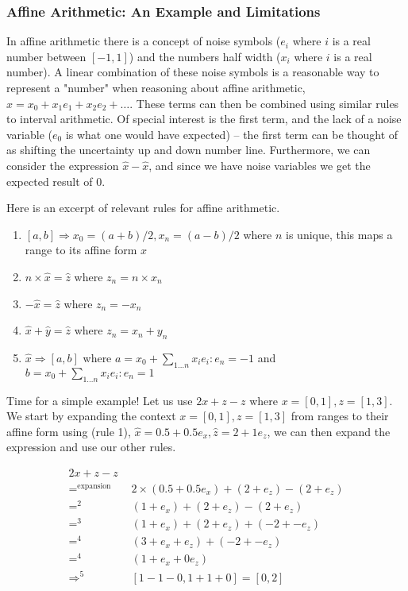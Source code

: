 \subsubsection{Affine Arithmetic: An Example and Limitations}
In affine arithmetic there is a concept of noise symbols ($e_i$ where $i$ is a real number between $[-1, 1]$) and the numbers half width ($x_i$ where $i$ is a real number). A linear combination of these noise symbols is a reasonable way to represent a "number" when reasoning about affine arithmetic, $\hat{x} = x_0 + x_1e_1 + x_2e_2 + \dots$. These terms can then be combined using similar rules to interval arithmetic. Of special interest is the first term, and the lack of a noise variable ($e_0$ is what one would have expected) -- the first term can be thought of as shifting the uncertainty up and down number line. Furthermore, we can consider the expression $\hat{x} - \hat{x}$, and since we have noise variables we get the expected result of $0$.\cite{src:affAri} 

Here is an excerpt of relevant rules for affine arithmetic.
\begin{enumerate}
  \item $[a, b] \Rightarrow x_0 = (a + b) / 2, x_n = (a - b) / 2$ where $n$ is unique, this maps a range to its affine form $\hat{x}$
  \item $n \times \hat{x} = \hat{z}$ where $z_n = n \times x_n$
  \item $-\hat{x} = \hat{z}$ where $z_n = -x_n$
  \item $\hat{x} + \hat{y} = \hat{z}$ where $z_n = x_n + y_n$
  \item $\hat{x} \Rightarrow [a, b]$ where $a = x_0 + \sum_{1\dots{}n}{x_ie_i}: e_n = -1$ and $b = x_0 + \sum_{1\dots{}n}{x_ie_i}: e_n = 1$
\end{enumerate}

Time for a simple example! Let us use $2x + z - z$ where $x = [0, 1], z = [1, 3]$.
We start by expanding the context $x = [0, 1], z = [1, 3]$ from ranges to their affine form using (rule 1), $\hat{x} = 0.5 + 0.5e_x, \hat{z} = 2 + 1e_z$, we can then expand the expression and use our other rules.

\begin{align*}
    2x + z - z \\
    =^{\text{expansion}} \quad & 2 \times (0.5 + 0.5e_x) + (2 + e_z) - (2 + e_z) \\
    =^{2} \quad & (1 + e_x) + (2 + e_z) - (2 + e_z) \\
    =^{3} \quad & (1 + e_x) + (2 + e_z) + (-2 + -e_z) \\
    =^{4} \quad & (3 + e_x + e_z) + (-2 + -e_z) \\
    =^{4} \quad & (1 + e_x + 0e_z) \\
    \Rightarrow^{5} \quad & [1 - 1 - 0, 1 + 1 + 0] = [0, 2]\\
\end{align*}

